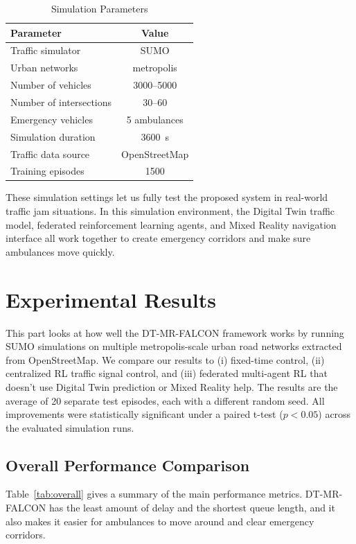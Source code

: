 \documentclass[conference]{IEEEtran}
\begin{document}
\begin{table}[t]
\centering
\caption{Simulation Parameters}
\label{tab:simparams}
\begin{tabular}{lc}
\toprule
Parameter & Value \\
\midrule
Traffic simulator & SUMO \\
Urban networks & metropolis \\
Number of vehicles & 3000--5000 \\
Number of intersections & 30--60 \\
Emergency vehicles & 5 ambulances \\
Simulation duration & 3600~s \\
Traffic data source & OpenStreetMap \\
Training episodes & 1500 \\
\bottomrule
\end{tabular}
\end{table}

These simulation settings let us fully test the proposed system in real-world traffic jam situations. In this simulation environment, the Digital Twin traffic model, federated reinforcement learning agents, and Mixed Reality navigation interface all work together to create emergency corridors and make sure ambulances move quickly.

\section{Experimental Results}
This part looks at how well the DT-MR-FALCON framework works by running SUMO simulations on multiple metropolis-scale urban road networks extracted from OpenStreetMap. We compare our results to (i) fixed-time control, (ii) centralized RL traffic signal control, and (iii) federated multi-agent RL that doesn't use Digital Twin prediction or Mixed Reality help. The results are the average of 20 separate test episodes, each with a different random seed. All improvements were statistically significant under a paired t-test ($p < 0.05$) across the evaluated simulation runs.

\subsection{Overall Performance Comparison}
Table~\ref{tab:overall} gives a summary of the main performance metrics. DT-MR-FALCON has the least amount of delay and the shortest queue length, and it also makes it easier for ambulances to move around and clear emergency corridors.
\end{document}
